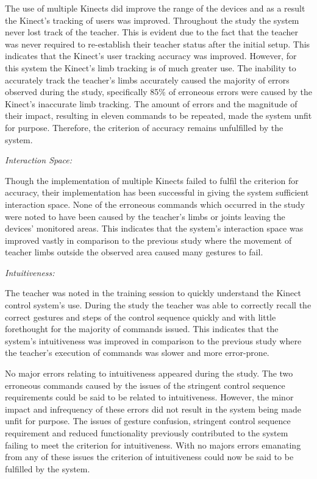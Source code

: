 \documentclass[link]{IWCOMP}
\begin{document}
The use of multiple Kinects did improve the range of the devices and as a result the Kinect's tracking of users was improved.
Throughout the study the system never lost track of the teacher.
This is evident due to the fact that the teacher was never required to re-establish their teacher status after the initial setup.
This indicates that the Kinect's user tracking accuracy was improved.
However, for this system the Kinect's limb tracking is of much greater use.
The inability to accurately track the teacher's limbs accurately caused the majority of errors observed during the study, specifically 85\% of erroneous errors were caused by the Kinect's inaccurate limb tracking.
The amount of errors and the magnitude of their impact, resulting in eleven commands to be repeated, made the system unfit for purpose.
Therefore, the criterion of accuracy remains unfulfilled by the system.

\emph{Interaction Space:}

Though the implementation of multiple Kinects failed to fulfil the criterion for accuracy, their implementation has been successful in giving the system sufficient interaction space.
None of the erroneous commands which occurred in the study were noted to have been caused by the teacher's limbs or joints leaving the devices' monitored areas.
This indicates that the system's interaction space was improved vastly in comparison to the previous study where the movement of teacher limbs outside the observed area caused many gestures to fail.

\emph{Intuitiveness:}

The teacher was noted in the training session to quickly understand the Kinect control system's use.
During the study the teacher was able to correctly recall the correct gestures and steps of the control sequence quickly and with little forethought for the majority of commands issued.
This indicates that the system's intuitiveness was improved in comparison to the previous study where the teacher's execution of commands was slower and more error-prone.

No major errors relating to intuitiveness appeared during the study.
The two erroneous commands caused by the issues of the stringent control sequence requirements could be said to be related to intuitiveness.
However, the minor impact and infrequency of these errors did not result in the system being made unfit for purpose.
The issues of gesture confusion, stringent control sequence requirement and reduced functionality previously contributed to the system failing to meet the criterion for intuitiveness.
With no majors errors emanating from any of these issues the criterion of intuitiveness could now be said to be fulfilled by the system.
\end{document}
